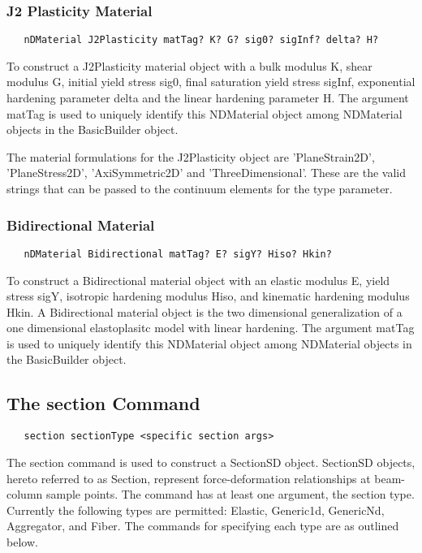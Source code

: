 \documentclass[12pt]{article}
\begin{document}
\subsubsection{J2 Plasticity Material}
{\sf\small
\begin{verbatim}
   nDMaterial J2Plasticity matTag? K? G? sig0? sigInf? delta? H?
\end{verbatim}
}

To construct a J2Plasticity material object with a bulk modulus
K, shear modulus G, initial yield stress sig0, final saturation yield
stress sigInf, exponential hardening parameter delta and the linear
hardening parameter H. The argument matTag is used to uniquely
identify this NDMaterial object among NDMaterial objects in the
BasicBuilder object. 

The material formulations for the J2Plasticity object are 'PlaneStrain2D',
'PlaneStress2D', 'AxiSymmetric2D' and 'ThreeDimensional'.  These are
the valid strings that can be passed to the continuum elements for the type
parameter. 

\subsubsection{Bidirectional Material}
{\sf\small
\begin{verbatim}
   nDMaterial Bidirectional matTag? E? sigY? Hiso? Hkin?
\end{verbatim}
}

To construct a Bidirectional material object with an elastic modulus
E, yield stress sigY, isotropic hardening modulus Hiso, and kinematic
hardening modulus Hkin. A Bidirectional material object is the two
dimensional generalization of a one dimensional elastoplasitc model
with linear hardening.
The argument matTag is used to
uniquely identify this NDMaterial object among NDMaterial objects
in the BasicBuilder object.

\subsection{The section Command}
{\sf\small
\begin{verbatim}
   section sectionType <specific section args>
\end{verbatim}
}

The section command is used to construct a SectionSD object. SectionSD
objects, hereto referred to as Section, represent force-deformation
relationships at beam-column sample points. The command has at least
one argument, the section type. Currently the following types are
permitted: Elastic, Generic1d, GenericNd, Aggregator, and Fiber. The
commands for specifying each type are as outlined below.
\end{document}
